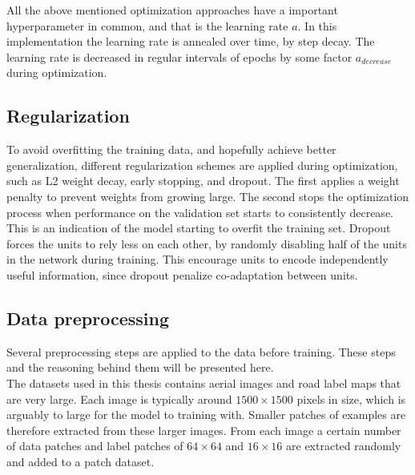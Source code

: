 All the above mentioned optimization approaches have a important hyperparameter in common, and that is the learning rate $a$. In this implementation the learning rate is annealed over time, by step decay. The learning rate is decreased in regular intervals of epochs by some factor $a_{decrease}$ during optimization. \\


\subsection{Regularization}
To avoid overfitting the training data, and hopefully achieve better generalization, different regularization schemes are applied during optimization, such as L2 weight decay, early stopping, and dropout. The first applies a weight penalty to prevent weights from growing large. The second stops the optimization process when performance on the validation set starts to consistently decrease. This is an indication of the model starting to overfit the training set. Dropout forces the units to rely less on each other, by randomly disabling half of the units in the network during training. This encourage units to encode independently useful information, since dropout penalize co-adaptation between units.\\


\subsection{Data preprocessing}
Several preprocessing steps are applied to the data before training. These steps and the reasoning behind them will be presented here. \\

The datasets used in this thesis contains aerial images and road label maps that are very large. Each image is typically around $1500 \times 1500$ pixels in size, which is arguably to large for the model to training with. Smaller patches of examples are therefore extracted from these larger images. From each image a certain number of data patches and label patches of $64 \times 64$ and $16 \times 16$ are extracted randomly and added to a patch dataset.\\


